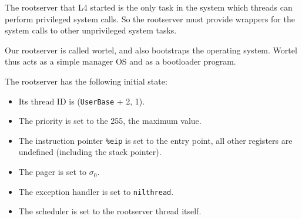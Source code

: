 The rootserver that L4 started is the only task in the system which
threads can perform privileged system calls.  So the rootserver must
provide wrappers for the system calls to other unprivileged system
tasks.

\begin{comment}
  For this, a simple authentication scheme is required.  The
  rootserver can keep a small, statically allocated table of threads
  which are granted access to the system call wrappers.  The caller
  could provide the index in the table for fast O(1) lookup instead
  linear search.  Threads with access could be allowed to add other
  threads or change existing table entries.  The same scheme can be
  used in the device driver framework.
  
  The rootserver should have one thread per CPU, and run at a high
  priority.
\end{comment}

Our rootserver is called wortel, and also bootstraps the operating
system.  Wortel thus acts as a simple manager OS and as a bootloader
program.

\begin{comment}
  Ideally, there would be a real manager OS on top of L4 in which you
  can run different sand-boxed operating systems.  Wortel implements
  only some rudimentary features such a system would provide: Access
  to the system memory and execution of privileged L4 system calls.

  If you had such a real manager OS, then this manager OS would start
  a bootloader to boot up a sand-boxed operating system.  For
  simplicity, wortel currently implements such a bootloader for the
  Hurd system.  Eventually, the code should be split to allow both
  components to develop independently.
\end{comment}

The rootserver has the following initial state:

\begin{itemize}
\item Its thread ID is (\verb/UserBase/ + 2, 1).

\item The priority is set to the 255, the maximum value.

  \begin{comment}
    The rootserver, or at least the system call wrapper, should run at
    a very high priority.
  \end{comment}

\item The instruction pointer \verb/%eip/ is set to the entry point,
all other registers are undefined (including the stack pointer).

\item The pager is set to $\sigma_0$.
  
\item The exception handler is set to \verb/nilthread/.
  
\item The scheduler is set to the rootserver thread itself.
\end{itemize}

